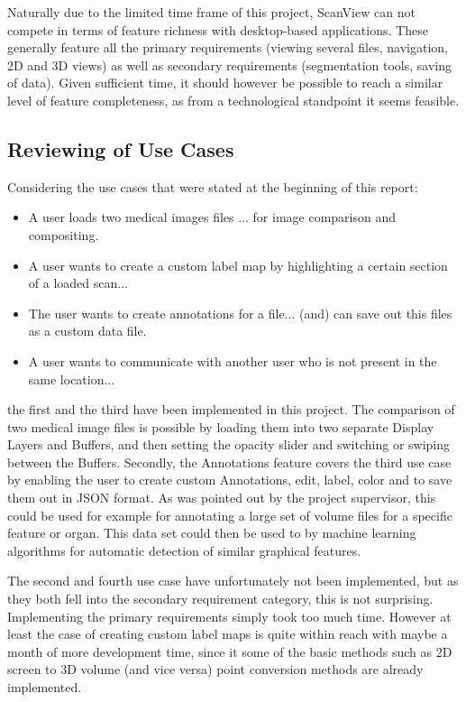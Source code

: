 \documentclass[a4paper,11pt,twoside]{article}
\begin{document}
Naturally due to the limited time frame of this project, ScanView can not compete in terms of feature richness with desktop-based applications. These generally feature all the primary requirements (viewing several files, navigation, 2D and 3D views) as well as secondary requirements (segmentation tools, saving of data). Given sufficient time, it should however be possible to reach a similar level of feature completeness, as from a technological standpoint it seems feasible.


\subsection{Reviewing of Use Cases}

Considering the use cases that were stated at the beginning of this report:

\begin{itemize}

\item A user loads two medical images files ... for image comparison and compositing.

\item A user wants to create a custom label map by highlighting a certain section of a loaded scan...

\item The user wants to create annotations for a file... (and) can save out this files as a custom data file.

\item A user wants to communicate with another user who is not present in the same location...
\end{itemize}

the first and the third have been implemented in this project. The comparison of two medical image files is possible by loading them into two separate Display Layers and Buffers, and then setting the opacity slider and switching or swiping between the Buffers. Secondly, the Annotations feature covers the third use case by enabling the user to create custom Annotations, edit, label, color and to save them out in JSON format. As was pointed out by the project supervisor, this could be used for example for annotating a large set of volume files for a specific feature or organ. This data set could then be used to by machine learning algorithms for automatic detection of similar graphical features.

The second and fourth use case have unfortunately not been implemented, but as they both fell into the secondary requirement category, this is not surprising. Implementing the primary requirements simply took too much time. However at least the case of creating custom label maps is quite within reach with maybe a month of more development time, since it some of the basic methods such as 2D screen to 3D volume (and vice versa) point conversion methods are already implemented.
\end{document}

